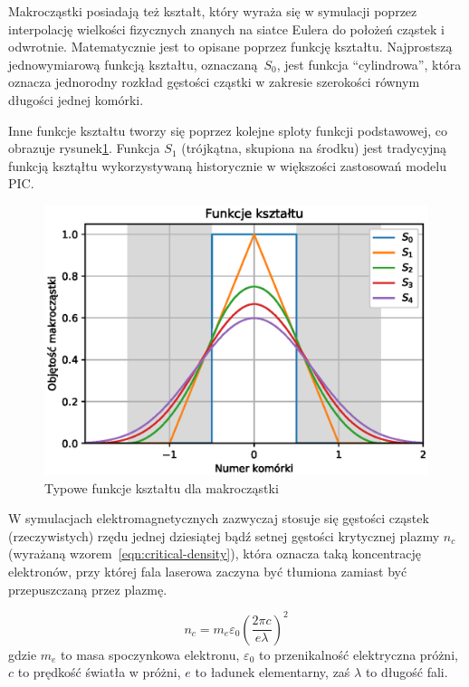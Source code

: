     Makrocząstki posiadają też kształt, który wyraża się w symulacji poprzez
    interpolację wielkości fizycznych znanych na siatce Eulera do położeń
    cząstek i odwrotnie. Matematycznie jest to opisane poprzez funkcję kształtu.
    Najprostszą jednowymiarową funkcją kształtu, oznaczaną $S_0$, jest funkcja
    ``cylindrowa'', która oznacza jednorodny rozkład gęstości cząstki w zakresie
    szerokości równym długości jednej komórki.
    
    Inne funkcje kształtu tworzy się poprzez kolejne sploty funkcji podstawowej,
    co obrazuje rysunek\ref{fig:shapefunctions}. Funkcja $S_1$ (trójkątna,
    skupiona na środku) jest tradycyjną funkcją ksztąłtu wykorzystywaną
    historycznie w większości zastosowań modelu PIC\@.


    \begin{figure}[h!]
      \includegraphics{Images/shapefunctions}
      \caption{Typowe funkcje kształtu dla makrocząstki\label{fig:shapefunctions}} %
    \end{figure}

    W symulacjach elektromagnetycznych zazwyczaj stosuje się
    gęstości cząstek (rzeczywistych) rzędu jednej dziesiątej bądź setnej
    gęstości krytycznej plazmy $n_c$ (wyrażaną wzorem~\ref{eqn:critical-density}),
    która oznacza taką koncentrację
    elektronów, przy której fala laserowa zaczyna być tłumiona zamiast być
    przepuszczaną przez plazmę.\cite{chen}

    \begin{equation}
        n_c = m_e \varepsilon_0 {(\frac{2 \pi c}{e \lambda})}^2
        \label{eqn:critical-density}
    \end{equation}
    gdzie $m_e$ to masa spoczynkowa elektronu, $\varepsilon_0$ to przenikalność
    elektryczna próżni, $c$ to prędkość światła w
    próżni, $e$ to ładunek elementarny, zaś $\lambda$ to długość fali.

